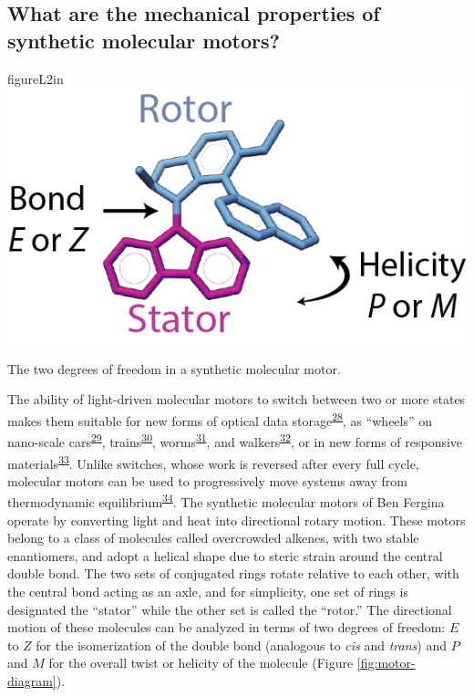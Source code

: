 \documentclass[11pt,notitlepage]{article}
\begin{document}
\hypertarget{what-are-the-mechanical-properties-of-synthetic-molecular-motors}{%
\subsection{What are the mechanical properties of synthetic molecular
motors?}\label{what-are-the-mechanical-properties-of-synthetic-molecular-motors}}


\begin{wrapfloat}{figure}{L}{2in}
\centering
\includegraphics{content/images/motor.png}
\caption{The two degrees of freedom in a synthetic molecular motor.}
\label{fig:motor-diagram}
\end{wrapfloat}

The ability of light-driven molecular motors to switch between two or
more states makes them suitable for new forms of optical data
storage\textsuperscript{\protect\hyperlink{ref-18PGyWtWV}{28}}, as
``wheels'' on nano-scale
cars\textsuperscript{\protect\hyperlink{ref-OAnfwOYX}{29}},
trains\textsuperscript{\protect\hyperlink{ref-10MPrT2Vf}{30}},
worms\textsuperscript{\protect\hyperlink{ref-Tels98bO}{31}}, and
walkers\textsuperscript{\protect\hyperlink{ref-SfUEsk0e}{32}}, or in new
forms of responsive
materials\textsuperscript{\protect\hyperlink{ref-jCuccJLJ}{33}}. Unlike
switches, whose work is reversed after every full cycle, molecular
motors can be used to progressively move systems away from thermodynamic
equilibrium\textsuperscript{\protect\hyperlink{ref-1H5r7SBir}{34}}. The
synthetic molecular motors of Ben Fergina operate by converting light
and heat into directional rotary motion. These motors belong to a class
of molecules called overcrowded alkenes, with two stable enantiomers,
and adopt a helical shape due to steric strain around the central double
bond. The two sets of conjugated rings rotate relative to each other,
with the central bond acting as an axle, and for simplicity, one set of
rings is designated the ``stator'' while the other set is called the
``rotor.'' The directional motion of these molecules can be analyzed in
terms of two degrees of freedom: \(E\) to \(Z\) for the isomerization of
the double bond (analogous to \emph{cis} and \emph{trans}) and \(P\) and
\(M\) for the overall twist or helicity of the molecule (Figure
\ref{fig:motor-diagram}).
\end{document}
